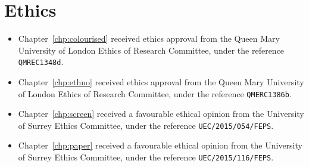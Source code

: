 \chapter*{Ethics}

\begin{itemize}
  \item Chapter~\ref{chp:colourised} received ethics approval from the Queen Mary University of
    London Ethics of Research Committee, under the reference \texttt{QMREC1348d}.
  \item Chapter~\ref{chp:ethno} received ethics approval from the Queen Mary University of
    London Ethics of Research Committee, under the reference \texttt{QMERC1386b}.
  \item Chapter~\ref{chp:screen} received a favourable ethical opinion from the University of Surrey Ethics
    Committee, under the reference \texttt{UEC/2015/054/FEPS}.
  \item Chapter~\ref{chp:paper} received a favourable ethical opinion from the University of Surrey Ethics
    Committee, under the reference \texttt{UEC/2015/116/FEPS}.
\end{itemize}

